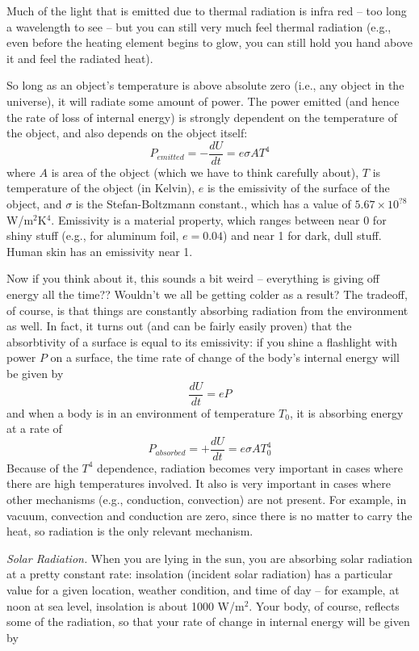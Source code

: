 Much of the light that is emitted due to thermal radiation is infra red -- too long a wavelength to see -- but you can still very much feel thermal radiation (e.g., even before the heating element begins to glow, you can still hold you hand above it and feel the radiated heat).

So long as an object's temperature is above absolute zero (i.e., any object in the universe), it will  radiate some amount of power.  The power emitted (and hence the rate of loss of internal energy) is strongly dependent on the temperature of the object, and also depends on the object itself:
$$P_{emitted} = -\frac{dU}{dt}  = e \sigma A T^4$$
where $A$ is area of the object (which we have to think carefully about), $T$ is temperature of the object (in Kelvin), $e$ is the emissivity of the surface of the object, and  $\sigma$ is the Stefan-Boltzmann constant., which has a value of $5.67\times 10^{?8}$ W/m$^{2}$K$^4$.  Emissivity is a material property, which ranges between near 0 for shiny stuff (e.g., for aluminum foil, $e=0.04$) and near 1 for dark, dull stuff.  Human skin has an emissivity near 1.

Now if you think about it, this sounds a bit weird -- everything is giving off energy all the time??  Wouldn't we all be getting colder as a result?  The tradeoff, of course, is that things are constantly absorbing radiation from the environment as well.
  In fact, it turns out (and can be fairly easily proven) that the absorbtivity of a surface is equal to its emissivity:  if you shine a flashlight with power $P$ on a surface, the time rate of change of the body's internal energy will be given by
$$\frac{dU}{dt}  = eP$$
and when a body is in an environment of temperature $T_0$, it is absorbing energy at a rate of 
$$P_{absorbed} = +\frac{dU}{dt}  = e \sigma A T_0^4$$
Because of the $T^4$ dependence, radiation becomes very important in cases where there are high temperatures involved.  It also is very important in cases where other mechanisms (e.g., conduction, convection) are not present.  For example, in vacuum, convection and conduction are zero, since there is no matter to carry the heat, so radiation is the only relevant mechanism. 

{\it Solar Radiation.} When you are lying in the sun, you are absorbing solar radiation at a pretty constant rate: insolation (incident solar radiation) has a particular value for a given location, weather condition, and time of day -- for example, at noon at sea level, insolation is about 1000 W/m$^2$.  Your body, of course, reflects some of the radiation, so that your rate of change in internal energy will be given by 

